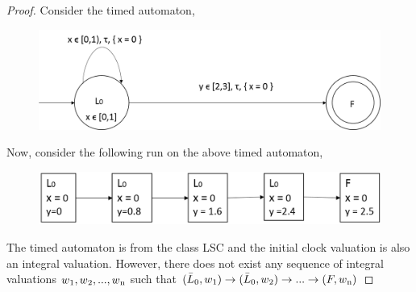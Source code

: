 \documentclass[12pt,letterpaper]{report}
\begin{document}
\begin{proof}
Consider the timed automaton,

\begin{figure}[h!]
\centering
\includegraphics[scale=0.7]{LSC.png}
\end{figure}

Now, consider the following run on the above timed automaton,
\begin{figure}[h!]
\centering
\includegraphics[scale=0.7]{lscrun.png}
\end{figure}

The timed automaton is from the class LSC and the initial clock valuation is also an integral valuation. However, there does not exist any sequence of integral valuations $w\textsubscript{1},w\textsubscript{2},...,w\textsubscript{n}$ such that
$(\bar{L}\textsubscript{0},w\textsubscript{1}) \rightarrow (\bar{L} \textsubscript{0},w\textsubscript{2})\rightarrow ... \rightarrow (F ,w\textsubscript{n})$

\end{proof}
\end{document}
